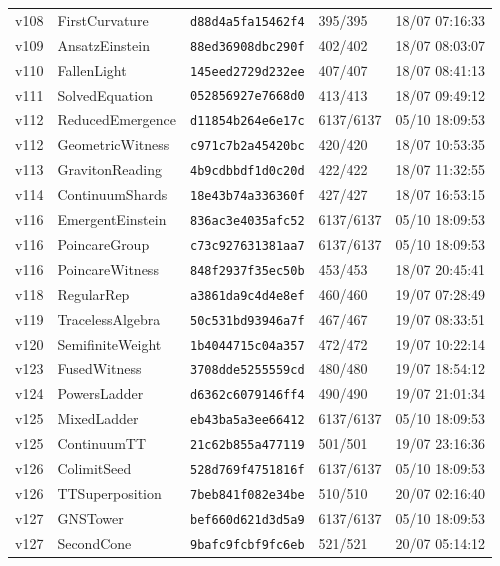 \documentclass[11pt]{article}
\theoremstyle{definition}\newtheorem{deriv}{Derivation}
\begin{document}
{\begin{longtable}{@{}lllll@{}}
v108 & FirstCurvature & \texttt{d88d4a5fa15462f4} & 395/395 & 18/07 07:16:33 \\
v109 & AnsatzEinstein & \texttt{88ed36908dbc290f} & 402/402 & 18/07 08:03:07 \\
v110 & FallenLight & \texttt{145eed2729d232ee} & 407/407 & 18/07 08:41:13 \\
v111 & SolvedEquation & \texttt{052856927e7668d0} & 413/413 & 18/07 09:49:12 \\
v112 & ReducedEmergence & \texttt{d11854b264e6e17c} & 6137/6137 & 05/10 18:09:53 \\
v112 & GeometricWitness & \texttt{c971c7b2a45420bc} & 420/420 & 18/07 10:53:35 \\
v113 & GravitonReading & \texttt{4b9cdbbdf1d0c20d} & 422/422 & 18/07 11:32:55 \\
v114 & ContinuumShards & \texttt{18e43b74a336360f} & 427/427 & 18/07 16:53:15 \\
v116 & EmergentEinstein & \texttt{836ac3e4035afc52} & 6137/6137 & 05/10 18:09:53 \\
v116 & PoincareGroup & \texttt{c73c927631381aa7} & 6137/6137 & 05/10 18:09:53 \\
v116 & PoincareWitness & \texttt{848f2937f35ec50b} & 453/453 & 18/07 20:45:41 \\
v118 & RegularRep & \texttt{a3861da9c4d4e8ef} & 460/460 & 19/07 07:28:49 \\
v119 & TracelessAlgebra & \texttt{50c531bd93946a7f} & 467/467 & 19/07 08:33:51 \\
v120 & SemifiniteWeight & \texttt{1b4044715c04a357} & 472/472 & 19/07 10:22:14 \\
v123 & FusedWitness & \texttt{3708dde5255559cd} & 480/480 & 19/07 18:54:12 \\
v124 & PowersLadder & \texttt{d6362c6079146ff4} & 490/490 & 19/07 21:01:34 \\
v125 & MixedLadder & \texttt{eb43ba5a3ee66412} & 6137/6137 & 05/10 18:09:53 \\
v125 & ContinuumTT & \texttt{21c62b855a477119} & 501/501 & 19/07 23:16:36 \\
v126 & ColimitSeed & \texttt{528d769f4751816f} & 6137/6137 & 05/10 18:09:53 \\
v126 & TTSuperposition & \texttt{7beb841f082e34be} & 510/510 & 20/07 02:16:40 \\
v127 & GNSTower & \texttt{bef660d621d3d5a9} & 6137/6137 & 05/10 18:09:53 \\
v127 & SecondCone & \texttt{9bafc9fcbf9fc6eb} & 521/521 & 20/07 05:14:12 \\

\end{longtable}}
\end{document}
